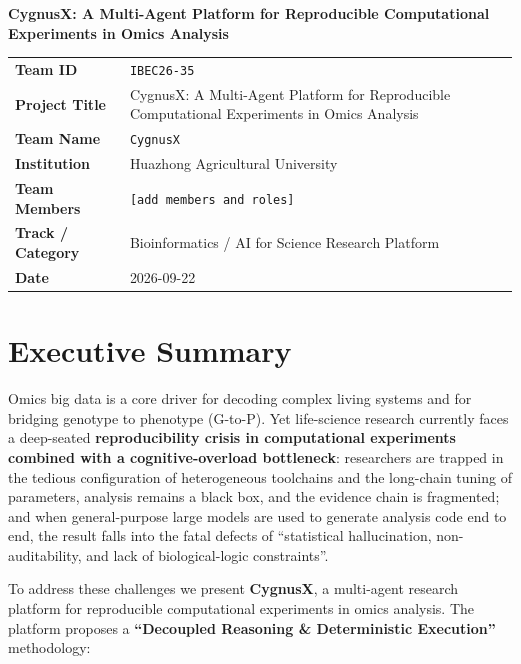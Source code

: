 \documentclass[11pt,a4paper]{article}
\begin{document}
\begin{center}
{\LARGE\bfseries CygnusX: A Multi-Agent Platform for Reproducible Computational Experiments in Omics Analysis}\\[1.0em]
\end{center}

\begin{tabularx}{\textwidth}{>{\bfseries}p{}X}
\toprule
Team ID & \texttt{IBEC26-35}\\
Project Title & CygnusX: A Multi-Agent Platform for Reproducible Computational Experiments in Omics Analysis\\
Team Name & \texttt{CygnusX}\\
Institution & Huazhong Agricultural University\\
Team Members & \texttt{[add members and roles]}\\
Track / Category & Bioinformatics / AI for Science Research Platform\\
Date & 2026-09-22\\
\bottomrule
\end{tabularx}

\section*{Executive Summary}

Omics big data is a core driver for decoding complex living systems and for bridging genotype to phenotype (G-to-P). Yet life-science research currently faces a deep-seated \textbf{reproducibility crisis in computational experiments combined with a cognitive-overload bottleneck}: researchers are trapped in the tedious configuration of heterogeneous toolchains and the long-chain tuning of parameters, analysis remains a black box, and the evidence chain is fragmented; and when general-purpose large models are used to generate analysis code end to end, the result falls into the fatal defects of ``statistical hallucination, non-auditability, and lack of biological-logic constraints''.

To address these challenges we present \textbf{CygnusX}, a multi-agent research platform for reproducible computational experiments in omics analysis. The platform proposes a \textbf{``Decoupled Reasoning \& Deterministic Execution''} methodology:
\end{document}
